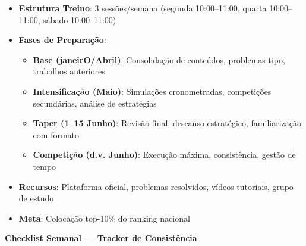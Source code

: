 \documentclass[a4paper,11pt]{article}
\newcommand{\mysection}[1]{%
  \vspace{16pt}
  \noindent\colorbox{dark}{\parbox{\linewidth}{\color{white}\large\bfseries\quad #1}}
  \vspace{8pt}\par
}
\begin{document}
\begin{tcolorbox}[enhanced, frame hidden, rounded corners, colback=coral!5, colframe=coral!50, boxrule=2pt, left=8pt, right=8pt, top=6pt, bottom=6pt, boxsep=4pt, arc=8pt, outer arc=8pt]
\begin{itemize}[before=\setlength\parindent{0pt}, label=\color{coral}{\(\bullet\)}, itemsep=6pt, topsep=4pt]
  \item \textbf{Estrutura Treino}: 3 sessões/semana (segunda 10:00--11:00, quarta 10:00--11:00, sábado 10:00--11:00)
  \item \textbf{Fases de Preparação}:
  \begin{itemize}[label=\textcolor{coral}{◆}, itemsep=4pt]
    \item \textbf{Base (janeirO/Abril)}: Consolidação de conteúdos, problemas-tipo, trabalhos anteriores
    \item \textbf{Intensificação (Maio)}: Simulações cronometradas, competições secundárias, análise de estratégias
    \item \textbf{Taper (1--15 Junho)}: Revisão final, descanso estratégico, familiarização com formato
    \item \textbf{Competição (d.v. Junho)}: Execução máxima, consistência, gestão de tempo
  \end{itemize}
  \item \textbf{Recursos}: Plataforma oficial, problemas resolvidos, vídeos tutoriais, grupo de estudo
  \item \textbf{Meta}: Colocação top-10\% do ranking nacional
\end{itemize}
\end{tcolorbox}

\vspace{14pt}

\mysection{Checklist Semanal — Tracker de Consistência}

\vspace{8pt}
\end{document}
